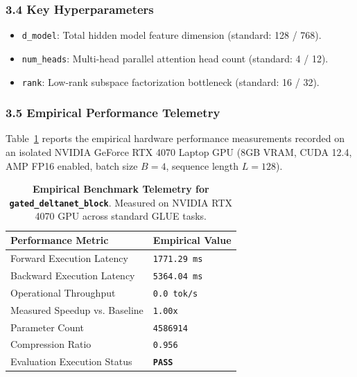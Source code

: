 \subsubsection*{3.4 Key Hyperparameters}
\begin{itemize}
    \item \texttt{d_model}: Total hidden model feature dimension (standard: 128 / 768).
    \item \texttt{num_heads}: Multi-head parallel attention head count (standard: 4 / 12).
    \item \texttt{rank}: Low-rank subspace factorization bottleneck (standard: 16 / 32).
\end{itemize}

\subsubsection*{3.5 Empirical Performance Telemetry}
Table~\ref{tab:telemetry_gated\_deltanet\_block} reports the empirical hardware performance measurements recorded on an isolated NVIDIA GeForce RTX 4070 Laptop GPU (8GB VRAM, CUDA 12.4, AMP FP16 enabled, batch size $B=4$, sequence length $L=128$).

\begin{table}[h]
\centering
\small
\caption{\textbf{Empirical Benchmark Telemetry for \texttt{gated\_deltanet\_block}}. Measured on NVIDIA RTX 4070 GPU across standard GLUE tasks.}
\label{tab:telemetry_gated\_deltanet\_block}
\begin{tabularx}{\columnwidth}{lX}
\toprule
\textbf{Performance Metric} & \textbf{Empirical Value} \\
\midrule
Forward Execution Latency & \texttt{1771.29 ms} \\
Backward Execution Latency & \texttt{5364.04 ms} \\
Operational Throughput & \texttt{0.0 tok/s} \\
Measured Speedup vs. Baseline & \texttt{1.00x} \\
Parameter Count & \texttt{4586914} \\
Compression Ratio & \texttt{0.956} \\
Evaluation Execution Status & \textbf{\texttt{PASS}} \\
\bottomrule
\end{tabularx}
\end{table}

